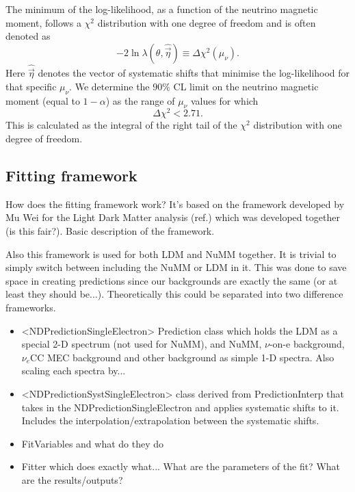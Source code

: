 The minimum of the log-likelihood, as a function of the neutrino magnetic moment, follows a $\chi^2$ distribution with one degree of freedom and is often denoted as
\begin{equation}
-2\ln\lambda\left(\theta,\hat{\overrightarrow{\eta}}\right)\equiv \Delta\chi^2\left(\mu_\nu\right).
\end{equation}
Here $\hat{\overrightarrow{\eta}}$ denotes the vector of systematic shifts that minimise the log-likelihood for that specific $\mu_\nu$. We determine the $90\%$ \gls{CL} limit on the neutrino magnetic moment (equal to $1-\alpha$) as the range of $\mu_\nu$ values for which 
\begin{equation}
\Delta\chi^2<2.71.
\end{equation}
This is calculated as the integral of the right tail of the $\chi^2$ distribution with one degree of freedom.

\subsection{Fitting framework}
How does the fitting framework work? It's based on the framework developed by Mu Wei for the Light Dark Matter analysis (ref.) which was developed together (is this fair?). Basic description of the framework.

Also this framework is used for both LDM and NuMM together. It is trivial to simply switch between including the NuMM or LDM in it. This was done to save space in creating predictions since our backgrounds are exactly the same (or at least they should be...). Theoretically this could be separated into two difference frameworks.

\begin{itemize}
\item <NDPredictionSingleElectron> Prediction class which holds the LDM as a special 2-D spectrum (not used for NuMM), and NuMM, $\nu$-on-e background, $\nu_e$CC MEC background and other background as simple 1-D spectra. Also scaling each spectra by...
\item <NDPredictionSystSingleElectron> class derived from PredictionInterp that takes in the NDPredictionSingleElectron and applies systematic shifts to it. Includes the interpolation/extrapolation between the systematic shifts.
\item FitVariables and what do they do
\item Fitter which does exactly what... What are the parameters of the fit? What are the results/outputs?
\end{itemize}
